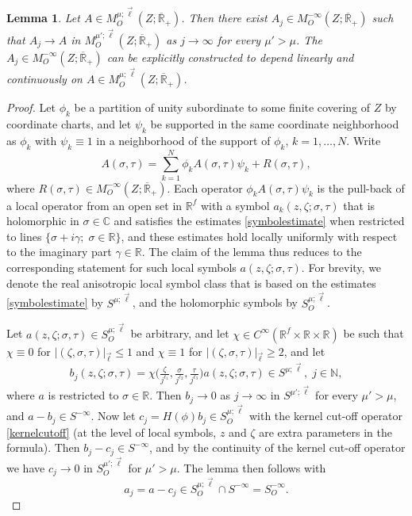 \documentclass[reqno]{amsart}
\numberwithin{equation}{section}
\newtheorem{lemma}[equation]{Lemma}
\theoremstyle{definition}
\def\C{\mathbb C}
\def\N{\mathbb N}
\def\R{\mathbb R}
\begin{document}
\begin{lemma}\label{AnalyticSmoothingApprox}
Let $A \in M^{\mu;\vec{\ell}}_O(Z;\overline{\R}_+)$. Then there exist $A_j \in M^{-\infty}_O(Z;\overline{\R}_+)$ such that $A_j \to A$ in $M^{\mu';\vec{\ell}}_O(Z;\overline{\R}_+)$ as $j \to \infty$ for every $\mu' > \mu$. The $A_j \in M^{-\infty}_O(Z;\overline{\R}_+)$ can be explicitly constructed to depend linearly and continuously on $A \in M^{\mu;\vec{\ell}}_O(Z;\overline{\R}_+)$.
\end{lemma}
\begin{proof}
Let $\phi_k$ be a partition of unity subordinate to some finite covering of $Z$ by coordinate charts, and let $\psi_k$ be supported in the same coordinate neighborhood as $\phi_k$ with $\psi_k \equiv 1$ in a neighborhood of the support of $\phi_k$, $k=1,\ldots,N$. Write
$$
A (\sigma,\tau) = \sum\limits_{k=1}^N \phi_kA(\sigma,\tau) \psi_k+ R(\sigma,\tau),
$$
where $R(\sigma,\tau) \in M^{-\infty}_O(Z;\overline{\R}_+)$. Each operator $\phi_kA(\sigma,\tau)\psi_k$ is the pull-back of a local operator from an open set in $\R^f$ with a symbol $a_k(z,\zeta;\sigma,\tau)$ that is holomorphic in $\sigma \in \C$ and satisfies the estimates \eqref{symbolestimate} when restricted to lines $\{\sigma + i\gamma;\;\sigma \in \R\}$, and these estimates hold locally uniformly with respect to the imaginary part $\gamma \in \R$. The claim of the lemma thus reduces to the corresponding statement for such local symbols $a(z,\zeta;\sigma,\tau)$. For brevity, we denote the real anisotropic local symbol class that is based on the estimates \eqref{symbolestimate} by $S^{\mu;\vec{\ell}}$, and the holomorphic symbols by $S_O^{\mu;\vec{\ell}}$.

Let $a(z,\zeta;\sigma,\tau) \in S_O^{\mu;\vec{\ell}}$ be arbitrary, and let $\chi \in C^{\infty}(\R^f\times\R\times\R)$ be such that $\chi \equiv 0$ for $|(\zeta,\sigma,\tau)|_{\vec{\ell}} \leq 1$ and $\chi \equiv 1$ for $|(\zeta,\sigma,\tau)|_{\vec{\ell}} \geq 2$, and let
$$
b_j(z,\zeta;\sigma,\tau) = \chi\bigl(\tfrac{\zeta}{j^{\ell_1}},\tfrac{\sigma}{j^{\ell_2}},\tfrac{\tau}{j^{\ell_3}}\bigr)a(z,\zeta;\sigma,\tau) \in S^{\mu;\vec{\ell}}, \; j \in \N,
$$
where $a$ is restricted to $\sigma \in \R$. Then $b_j \to 0$ as $j \to \infty$ in $S^{\mu';\vec{\ell}}$ for every $\mu' > \mu$, and $a - b_j \in S^{-\infty}$. Now let $c_j = H(\phi)b_j \in S_O^{\mu;\vec{\ell}}$ with the kernel cut-off operator \eqref{kernelcutoff} (at the level of local symbols, $z$ and $\zeta$ are extra parameters in the formula). Then $b_j - c_j \in S^{-\infty}$, and by the continuity of the kernel cut-off operator we have $c_j \to 0$ in $S^{\mu';\vec{\ell}}_O$ for $\mu' > \mu$. The lemma then follows with
$$
a_j = a - c_j \in S^{\mu;\vec{\ell}}_O \cap S^{-\infty} = S^{-\infty}_O.
$$
\end{proof}
\end{document}
